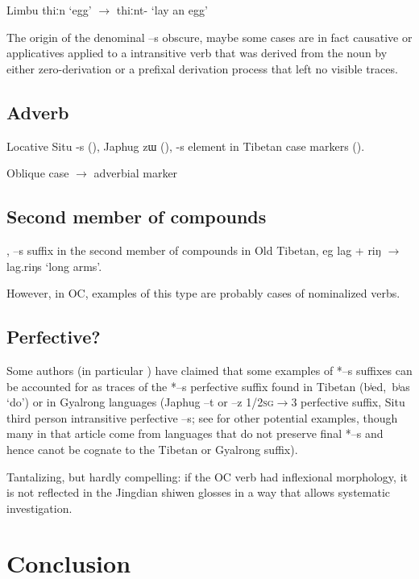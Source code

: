 \documentclass[oldfontcommands,oneside,a4paper,11pt]{article}
\newcommand{\ipa}[1]{{\phon \mbox{#1}}} %
\begin{document}
Limbu \ipa{thiːn} `egg' $\rightarrow$ \ipa{thiːnt-} `lay an egg'

The origin of the denominal \ipa{--s} obscure, maybe some cases are in fact causative or applicatives applied to a intransitive verb that was derived from the noun by either zero-derivation or a prefixal derivation process that left no visible traces.

\subsection{Adverb}

 
Locative Situ \ipa{-s} (\citealt{linxr93jiarong}), Japhug \ipa{zɯ} (\citealt[167-9]{jacques08zh}), \ipa{-s} element in Tibetan case markers (\citealt{hill12bas}).

Oblique case $\rightarrow$ adverbial marker


\subsection{Second member of compounds}


\citet{uebach08rjeblas}, \ipa{--s} suffix in the second member of compounds in Old Tibetan, eg \ipa{lag} + \ipa{riŋ} $\rightarrow$ \ipa{lag.riŋs} `long arms'.

 However, in OC, examples of this type are probably cases of nominalized verbs.
 
\subsection{Perfective?}
Some authors (in particular \citealt{jinlx06}) have claimed that some examples of *\ipa{--s} suffixes can be accounted for as traces of the *\ipa{--s} perfective suffix found in Tibetan (\ipa{bʲed, bʲas} `do') or in Gyalrong languages (Japhug \ipa{--t} or \ipa{--z} \textsc{1/2sg}$\rightarrow$3 perfective suffix, Situ third person intransitive perfective \ipa{--s}; see \citealt{huangbf97s.houzhui} for other potential examples, though many in that article come from languages that do not preserve final *\ipa{--s} and hence canot be cognate to the Tibetan or Gyalrong suffix).

Tantalizing, but hardly compelling: if the OC verb had inflexional morphology, it is not reflected in the Jingdian shiwen glosses in a way that allows systematic investigation.

\section{Conclusion}



\end{document}
